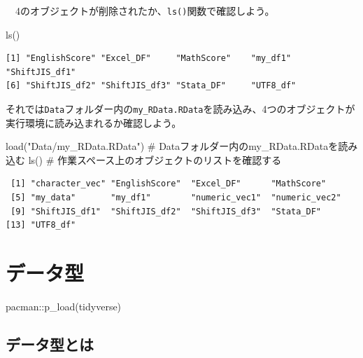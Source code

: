 \documentclass[
  a4paper,
  pandoc,
  ja=standard,
  jafont=haranoaji]{bxjsbook}
\newenvironment{Shaded}{\begin{snugshade}}{\end{snugshade}}
\newcommand{\CommentTok}[1]{\textcolor[rgb]{0.37,0.37,0.37}{#1}}
\newcommand{\FunctionTok}[1]{\textcolor[rgb]{0.28,0.35,0.67}{#1}}
\newcommand{\NormalTok}[1]{\textcolor[rgb]{0.00,0.48,0.65}{#1}}
\newcommand{\SpecialCharTok}[1]{\textcolor[rgb]{0.37,0.37,0.37}{#1}}
\newcommand{\StringTok}[1]{\textcolor[rgb]{0.13,0.47,0.30}{#1}}
\begin{document}
　4のオブジェクトが削除されたか、\texttt{ls()}関数で確認しよう。

\begin{Shaded}
\begin{Highlighting}[numbers=left,,]
\FunctionTok{ls}\NormalTok{()}
\end{Highlighting}
\end{Shaded}

\begin{verbatim}
[1] "EnglishScore" "Excel_DF"     "MathScore"    "my_df1"       "ShiftJIS_df1"
[6] "ShiftJIS_df2" "ShiftJIS_df3" "Stata_DF"     "UTF8_df"     
\end{verbatim}

それでは\texttt{Data}フォルダー内の\texttt{my\_RData.RData}を読み込み、4つのオブジェクトが実行環境に読み込まれるか確認しよう。

\begin{Shaded}
\begin{Highlighting}[numbers=left,,]
\FunctionTok{load}\NormalTok{(}\StringTok{"Data/my\_RData.RData"}\NormalTok{) }\CommentTok{\# Dataフォルダー内のmy\_RData.RDataを読み込む}
\FunctionTok{ls}\NormalTok{()                        }\CommentTok{\# 作業スペース上のオブジェクトのリストを確認する}
\end{Highlighting}
\end{Shaded}

\begin{verbatim}
 [1] "character_vec" "EnglishScore"  "Excel_DF"      "MathScore"    
 [5] "my_data"       "my_df1"        "numeric_vec1"  "numeric_vec2" 
 [9] "ShiftJIS_df1"  "ShiftJIS_df2"  "ShiftJIS_df3"  "Stata_DF"     
[13] "UTF8_df"      
\end{verbatim}

\hypertarget{sec-datatype}{%
\chapter{データ型}\label{sec-datatype}}

\begin{Shaded}
\begin{Highlighting}[numbers=left,,]
\NormalTok{pacman}\SpecialCharTok{::}\FunctionTok{p\_load}\NormalTok{(tidyverse)}
\end{Highlighting}
\end{Shaded}

\hypertarget{sec-type_intro}{%
\section{データ型とは}\label{sec-type_intro}}
\end{document}
